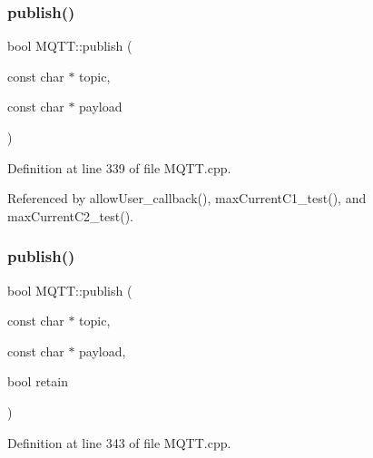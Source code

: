 \mbox{\label{class_m_q_t_t_a0a335a0e6c60ea0e256f76a1969a5137}} 
\subsubsection{\texorpdfstring{publish()}{publish()}\hspace{0.1cm}{\footnotesize\ttfamily [1/10]}}
{\footnotesize\ttfamily bool M\+Q\+T\+T\+::publish (\begin{DoxyParamCaption}\item[{const char $\ast$}]{topic,  }\item[{const char $\ast$}]{payload }\end{DoxyParamCaption})}



Definition at line 339 of file M\+Q\+T\+T.\+cpp.



Referenced by allow\+User\+\_\+callback(), max\+Current\+C1\+\_\+test(), and max\+Current\+C2\+\_\+test().

\mbox{\label{class_m_q_t_t_a802136b5419b3a694ea88be27bdb9043}} 
\subsubsection{\texorpdfstring{publish()}{publish()}\hspace{0.1cm}{\footnotesize\ttfamily [2/10]}}
{\footnotesize\ttfamily bool M\+Q\+T\+T\+::publish (\begin{DoxyParamCaption}\item[{const char $\ast$}]{topic,  }\item[{const char $\ast$}]{payload,  }\item[{bool}]{retain }\end{DoxyParamCaption})}



Definition at line 343 of file M\+Q\+T\+T.\+cpp.

\mbox{\label{class_m_q_t_t_ae9321f0f8b365eaf32c87706273cb473}} 
